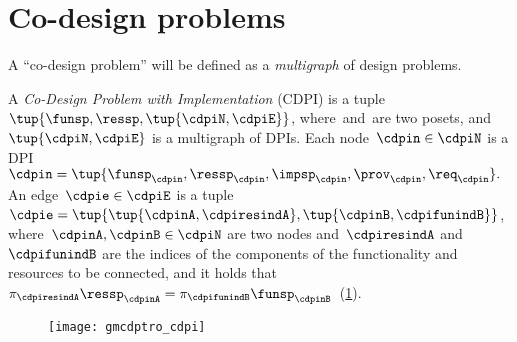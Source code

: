 

\section{Co-design problems}
\label{sec:Co-design-problems}

A ``co-design problem'' will be defined as a \emph{multigraph} of design
problems.
\begin{definition}
    \label{def:cdpi}
    A \emph{Co-Design Problem with Implementation} (CDPI)
    is a tuple~$\tup{\funsp,\ressp,\tup{\cdpiN,\cdpiE}}$,
    where~\funsp and~\ressp are two posets, and~$\tup{ \cdpiN,\cdpiE} $
    is a multigraph of DPIs.
    Each node~$\cdpin\in\cdpiN$ is a
    DPI~$\cdpin=\tup{\funsp_{\cdpin},\ressp_{\cdpin},\impsp_{\cdpin},\prov_{\cdpin},\req_{\cdpin}}.$
    An edge~$\cdpie\in\cdpiE$ is a tuple $\cdpie=\tup{ \tup{ \cdpinA,\cdpiresindA} ,\tup{\cdpinB,\cdpifunindB}}$,
    where~$\cdpinA,\cdpinB\in\cdpiN$ are two nodes and~$\cdpiresindA$
    and~$\cdpifunindB$ are the indices of the components of the functionality
    and resources to be connected, and it holds that~$\pi_{\cdpiresindA}\ressp_{\cdpinA}=\pi_{\cdpifunindB}\funsp_{\cdpinB}$~(\cref{fig:mcdps}).

    \begin{figure}[h]
        \centering
        \texttt{[image: gmcdptro\_cdpi]}
        \caption{\label{fig:mcdps}}
    \end{figure}

\end{definition}

